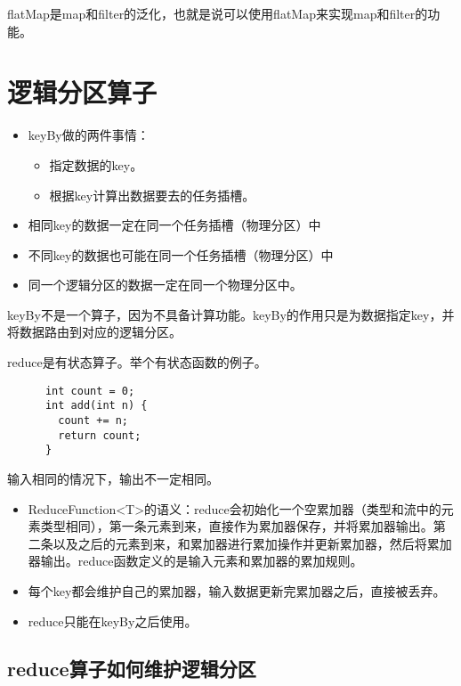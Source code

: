 \documentclass[cn,11pt,chinese]{elegantbook}
\begin{document}
flatMap是map和filter的泛化，也就是说可以使用flatMap来实现map和filter的功能。

\section{逻辑分区算子}

\begin{itemize}
  \item keyBy做的两件事情：
  \begin{itemize}
    \item 指定数据的key。
    \item 根据key计算出数据要去的任务插槽。
  \end{itemize}
  \item 相同key的数据一定在同一个任务插槽（物理分区）中
  \item 不同key的数据也可能在同一个任务插槽（物理分区）中
  \item 同一个逻辑分区的数据一定在同一个物理分区中。
\end{itemize}

\begin{note}
  keyBy不是一个算子，因为不具备计算功能。keyBy的作用只是为数据指定key，并将数据路由到对应的逻辑分区。
\end{note}

reduce是有状态算子。举个有状态函数的例子。

\begin{lstlisting}
      int count = 0;
      int add(int n) {
        count += n;
        return count;
      }
\end{lstlisting}

输入相同的情况下，输出不一定相同。

\begin{itemize}
  \item ReduceFunction<T>的语义：reduce会初始化一个空累加器（类型和流中的元素类型相同），第一条元素到来，直接作为累加器保存，并将累加器输出。第二条以及之后的元素到来，和累加器进行累加操作并更新累加器，然后将累加器输出。reduce函数定义的是输入元素和累加器的累加规则。
  \item 每个key都会维护自己的累加器，输入数据更新完累加器之后，直接被丢弃。
  \item reduce只能在keyBy之后使用。
\end{itemize}

\subsection{reduce算子如何维护逻辑分区}
\end{document}
